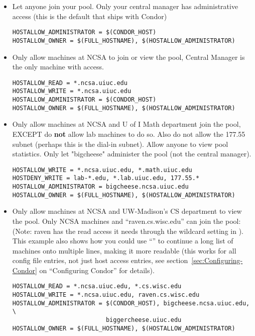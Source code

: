 \begin{itemize}

\item Let anyone join your pool.  Only your central manager has
administrative access (this is the default that ships with Condor)
\begin{verbatim}
HOSTALLOW_ADMINISTRATOR = $(CONDOR_HOST)
HOSTALLOW_OWNER = $(FULL_HOSTNAME), $(HOSTALLOW_ADMINISTRATOR)
\end{verbatim}

\item Only allow machines at NCSA to join or view the pool, Central
Manager is the only machine with  access.
\begin{verbatim}
HOSTALLOW_READ = *.ncsa.uiuc.edu
HOSTALLOW_WRITE = *.ncsa.uiuc.edu
HOSTALLOW_ADMINISTRATOR = $(CONDOR_HOST)
HOSTALLOW_OWNER = $(FULL_HOSTNAME), $(HOSTALLOW_ADMINISTRATOR)
\end{verbatim}

\item Only allow machines at NCSA and U of I Math department join the
pool, EXCEPT do \textbf{not} allow lab machines to do so.  Also do not
allow the 177.55 subnet (perhaps this is the dial-in subnet).  Allow
anyone to view pool statistics.  Only let "bigcheese" administer the
pool (not the central manager).
\begin{verbatim}
HOSTALLOW_WRITE = *.ncsa.uiuc.edu, *.math.uiuc.edu
HOSTDENY_WRITE = lab-*.edu, *.lab.uiuc.edu, 177.55.*
HOSTALLOW_ADMINISTRATOR = bigcheese.ncsa.uiuc.edu
HOSTALLOW_OWNER = $(FULL_HOSTNAME), $(HOSTALLOW_ADMINISTRATOR)
\end{verbatim}

\item Only allow machines at NCSA and UW-Madison's CS department to
view the pool.  Only NCSA machines and ``raven.cs.wisc.edu'' can join
the pool: (Note: raven has the read access it needs through the
wildcard setting in ).  This example also shows
how you could use ``\verb@\@'' to continue a long list of machines
onto multiple lines, making it more readable (this works for all
config file entries, not just host access entries, see
section~\ref{sec:Configuring-Condor} on ``Configuring Condor'' for
details).
\begin{verbatim}
HOSTALLOW_READ = *.ncsa.uiuc.edu, *.cs.wisc.edu
HOSTALLOW_WRITE = *.ncsa.uiuc.edu, raven.cs.wisc.edu
HOSTALLOW_ADMINISTRATOR = $(CONDOR_HOST), bigcheese.ncsa.uiuc.edu, \
                          biggercheese.uiuc.edu
HOSTALLOW_OWNER = $(FULL_HOSTNAME), $(HOSTALLOW_ADMINISTRATOR)
\end{verbatim}


\end{itemize}
